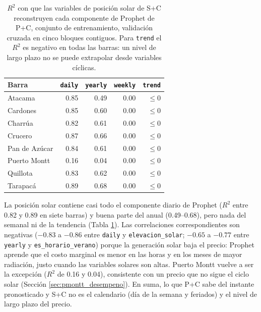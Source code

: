 \begin{table}[htbp]
    \centering
    \begin{tabular}{lrrrr}
        \toprule
        Barra & \texttt{daily} & \texttt{yearly} & \texttt{weekly} & \texttt{trend} \\
        \midrule
        Atacama       & 0.85 & 0.49 & 0.00 & $\le 0$ \\
        Cardones      & 0.85 & 0.60 & 0.00 & $\le 0$ \\
        Charrúa       & 0.82 & 0.61 & 0.00 & $\le 0$ \\
        Crucero       & 0.87 & 0.66 & 0.00 & $\le 0$ \\
        Pan de Azúcar & 0.84 & 0.61 & 0.00 & $\le 0$ \\
        Puerto Montt  & 0.16 & 0.04 & 0.00 & $\le 0$ \\
        Quillota      & 0.83 & 0.62 & 0.00 & $\le 0$ \\
        Tarapacá      & 0.89 & 0.68 & 0.00 & $\le 0$ \\
        \bottomrule
    \end{tabular}
    \vspace{0.2cm}
    \caption{$R^2$ con que las variables de posición solar de S+C reconstruyen cada componente de Prophet de P+C, conjunto de entrenamiento, validación cruzada en cinco bloques contiguos. Para \texttt{trend} el $R^2$ es negativo en todas las barras: un nivel de largo plazo no se puede extrapolar desde variables cíclicas.}
    \label{tab:informacion_pc_sc}
\end{table}

La posición solar contiene casi todo el componente diario de Prophet ($R^2$ entre 0.82 y 0.89 en siete barras) y buena parte del anual (0.49--0.68), pero nada del semanal ni de la tendencia (Tabla \ref{tab:informacion_pc_sc}). Las correlaciones correspondientes son negativas ($-0.83$ a $-0.86$ entre \texttt{daily} y \texttt{elevacion\_solar}; $-0.65$ a $-0.77$ entre \texttt{yearly} y \texttt{es\_horario\_verano}) porque la generación solar baja el precio: Prophet aprende que el costo marginal es menor en las horas y en los meses de mayor radiación, justo cuando las variables solares son altas. Puerto Montt vuelve a ser la excepción ($R^2$ de 0.16 y 0.04), consistente con un precio que no sigue el ciclo solar (Sección \ref{sec:pmontt_desempeno}). En suma, lo que P+C sabe del instante pronosticado y S+C no es el calendario (día de la semana y feriados) y el nivel de largo plazo del precio.

